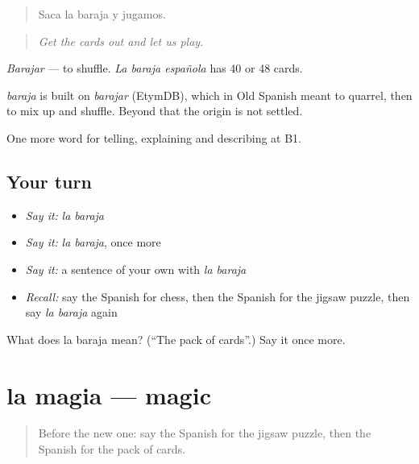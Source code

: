 \begin{quote}
Saca la baraja y jugamos.
\end{quote}

\begin{quote}
\emph{Get the cards out and let us play.}
\end{quote}

\emph{Barajar} — to shuffle. \emph{La baraja española} has 40 or 48 cards.

\begin{cousinweb}
\emph{baraja} is built on \emph{barajar} (EtymDB), which in Old Spanish meant to quarrel, then to mix up and shuffle. Beyond that the origin is not settled.
\end{cousinweb}

\begin{grammarlens}[title={What you've built}]
One more word for telling, explaining and describing at B1.
\end{grammarlens}

\subsection*{Your turn}
\begin{itemize}
\raggedright
  \item \emph{Say it:} \emph{la baraja}
  \item \emph{Say it:} \emph{la baraja}, once more
  \item \emph{Say it:} a sentence of your own with \emph{la baraja}
  \item \emph{Recall:} say the Spanish for chess, then the Spanish for the jigsaw puzzle, then say \emph{la baraja} again
\end{itemize}

\begin{tcolorbox}[breakable,colback=teal!4,colframe=teal!35!black,title={Before you move on}]
What does la baraja mean? (\textquotedblleft{}The pack of cards\textquotedblright{}.) Say it once more.
\end{tcolorbox}
\section[la magia]{la magia — magic}

\label{lesson:ES-C752-magia}



\begin{quote}
Before the new one: say the Spanish for the jigsaw puzzle, then the Spanish for the pack of cards.
\end{quote}

